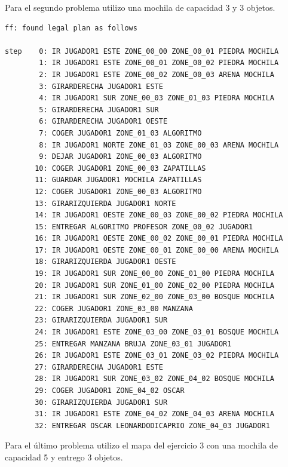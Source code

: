 \documentclass[12pt]{article}
\begin{document}
Para el segundo problema utilizo una mochila de capacidad 3 y 3 objetos.

\begin{verbatim}
ff: found legal plan as follows

step    0: IR JUGADOR1 ESTE ZONE_00_00 ZONE_00_01 PIEDRA MOCHILA
        1: IR JUGADOR1 ESTE ZONE_00_01 ZONE_00_02 PIEDRA MOCHILA
        2: IR JUGADOR1 ESTE ZONE_00_02 ZONE_00_03 ARENA MOCHILA
        3: GIRARDERECHA JUGADOR1 ESTE
        4: IR JUGADOR1 SUR ZONE_00_03 ZONE_01_03 PIEDRA MOCHILA
        5: GIRARDERECHA JUGADOR1 SUR
        6: GIRARDERECHA JUGADOR1 OESTE
        7: COGER JUGADOR1 ZONE_01_03 ALGORITMO
        8: IR JUGADOR1 NORTE ZONE_01_03 ZONE_00_03 ARENA MOCHILA
        9: DEJAR JUGADOR1 ZONE_00_03 ALGORITMO
       10: COGER JUGADOR1 ZONE_00_03 ZAPATILLAS
       11: GUARDAR JUGADOR1 MOCHILA ZAPATILLAS
       12: COGER JUGADOR1 ZONE_00_03 ALGORITMO
       13: GIRARIZQUIERDA JUGADOR1 NORTE
       14: IR JUGADOR1 OESTE ZONE_00_03 ZONE_00_02 PIEDRA MOCHILA
       15: ENTREGAR ALGORITMO PROFESOR ZONE_00_02 JUGADOR1
       16: IR JUGADOR1 OESTE ZONE_00_02 ZONE_00_01 PIEDRA MOCHILA
       17: IR JUGADOR1 OESTE ZONE_00_01 ZONE_00_00 ARENA MOCHILA
       18: GIRARIZQUIERDA JUGADOR1 OESTE
       19: IR JUGADOR1 SUR ZONE_00_00 ZONE_01_00 PIEDRA MOCHILA
       20: IR JUGADOR1 SUR ZONE_01_00 ZONE_02_00 PIEDRA MOCHILA
       21: IR JUGADOR1 SUR ZONE_02_00 ZONE_03_00 BOSQUE MOCHILA
       22: COGER JUGADOR1 ZONE_03_00 MANZANA
       23: GIRARIZQUIERDA JUGADOR1 SUR
       24: IR JUGADOR1 ESTE ZONE_03_00 ZONE_03_01 BOSQUE MOCHILA
       25: ENTREGAR MANZANA BRUJA ZONE_03_01 JUGADOR1
       26: IR JUGADOR1 ESTE ZONE_03_01 ZONE_03_02 PIEDRA MOCHILA
       27: GIRARDERECHA JUGADOR1 ESTE
       28: IR JUGADOR1 SUR ZONE_03_02 ZONE_04_02 BOSQUE MOCHILA
       29: COGER JUGADOR1 ZONE_04_02 OSCAR
       30: GIRARIZQUIERDA JUGADOR1 SUR
       31: IR JUGADOR1 ESTE ZONE_04_02 ZONE_04_03 ARENA MOCHILA
       32: ENTREGAR OSCAR LEONARDODICAPRIO ZONE_04_03 JUGADOR1
\end{verbatim}

Para el último problema utilizo el mapa del ejercicio 3 con una mochila de capacidad 5 y entrego 3 objetos.
\end{document}
